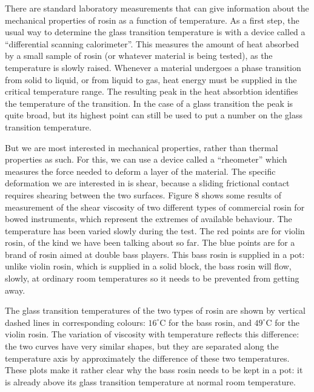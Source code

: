 
  There are standard laboratory measurements that can give information about 
  the mechanical properties of rosin as a function of temperature. As a first 
  step, the usual way to determine the glass transition temperature is with a 
  device called a “differential scanning calorimeter”. This measures the amount 
  of heat absorbed by a small sample of rosin (or whatever material is being 
  tested), as the temperature is slowly raised. Whenever a material undergoes a 
  phase transition from solid to liquid, or from liquid to gas, heat energy 
  must be supplied in the critical temperature range. The resulting peak in the 
  heat absorbtion identifies the temperature of the transition. In the case of 
  a glass transition the peak is quite broad, but its highest point can still 
  be used to put a number on the glass transition temperature. 

  But we are most interested in mechanical properties, rather than thermal 
  properties as such. For this, we can use a device called a “rheometer” which 
  measures the force needed to deform a layer of the material. The specific 
  deformation we are interested in is shear, because a sliding frictional 
  contact requires shearing between the two surfaces. Figure 8 shows some 
  results of measurement of the shear viscosity of two different types of 
  commercial rosin for bowed instruments, which represent the extremes of 
  available behaviour. The temperature has been varied slowly during the test. 
  The red points are for violin rosin, of the kind we have been talking about 
  so far. The blue points are for a brand of rosin aimed at double bass 
  players. This bass rosin is supplied in a pot: unlike violin rosin, which is 
  supplied in a solid block, the bass rosin will flow, slowly, at ordinary room 
  temperatures so it needs to be prevented from getting away. 


  The glass transition temperatures of the two types of rosin are shown by 
  vertical dashed lines in corresponding colours: $16^\circ$C for the bass 
  rosin, and $49^\circ$C for the violin rosin. The variation of viscosity with 
  temperature reflects this difference: the two curves have very similar 
  shapes, but they are separated along the temperature axis by approximately 
  the difference of these two temperatures. These plots make it rather clear 
  why the bass rosin needs to be kept in a pot: it is already above its glass 
  transition temperature at normal room temperature. 

